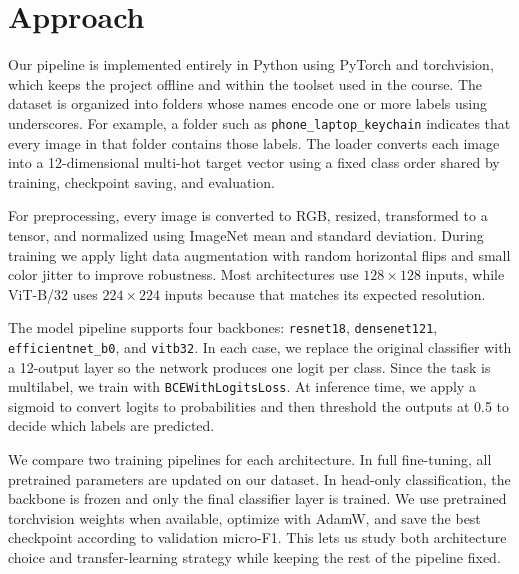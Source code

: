 \documentclass[10pt]{article}
\begin{document}
\section{Approach}

Our pipeline is implemented entirely in Python using PyTorch and torchvision,
which keeps the project offline and within the toolset used in the course. The
dataset is organized into folders whose names encode one or more labels using
underscores. For example, a folder such as
\texttt{phone\_laptop\_keychain} indicates that every image in that folder
contains those labels. The loader converts each image into a 12-dimensional
multi-hot target vector using a fixed class order shared by training,
checkpoint saving, and evaluation.

For preprocessing, every image is converted to RGB, resized, transformed to a
tensor, and normalized using ImageNet mean and standard deviation. During
training we apply light data augmentation with random horizontal flips and
small color jitter to improve robustness. Most architectures use
$128\times128$ inputs, while ViT-B/32 uses $224\times224$ inputs because that
matches its expected resolution.

The model pipeline supports four backbones: \texttt{resnet18},
\texttt{densenet121}, \texttt{efficientnet\_b0}, and \texttt{vitb32}. In each
case, we replace the original classifier with a 12-output layer so the network
produces one logit per class. Since the task is multilabel, we train with
\texttt{BCEWithLogitsLoss}. At inference time, we apply a sigmoid to convert
logits to probabilities and then threshold the outputs at 0.5 to decide which
labels are predicted.

We compare two training pipelines for each architecture. In full fine-tuning,
all pretrained parameters are updated on our dataset. In head-only
classification, the backbone is frozen and only the final classifier layer is
trained. We use pretrained torchvision weights when available, optimize with
AdamW, and save the best checkpoint according to validation micro-F1. This lets
us study both architecture choice and transfer-learning strategy while keeping
the rest of the pipeline fixed.





\end{document}
